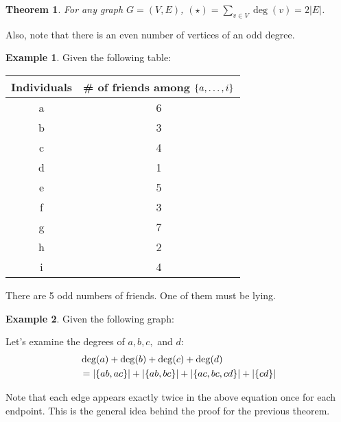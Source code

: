 \documentclass[]{article}
\newtheorem*{theorem}{Theorem}
\theoremstyle{definition}
\newtheorem{ex}{Example}[section]
\newcommand{\lecture}[1]{\marginpar{{\footnotesize $\leftarrow$ \underline{#1}}}}
\DeclarePairedDelimiter{\set}{\lbrace}{\rbrace}
\begin{document}
			\begin{theorem}
				For any graph $G = (V, E)$, $(\star) = \displaystyle \sum_{v \in V} \deg(v) = 2|E|$.
			\end{theorem}

			Also, note that there is an even number of vertices of an odd degree.
			
			\begin{ex} Given the following table:
				\begin{center}
					\begin{tabular}{c|c}
						Individuals & \# of friends among $\set{a, \ldots, i}$ \\ \hline
						a & 6 \\
						b & 3 \\
						c & 4 \\
						d & 1 \\
						e & 5 \\
						f & 3 \\
						g & 7 \\
						h & 2 \\
						i & 4
					\end{tabular}
				\end{center}
				
				There are 5 odd numbers of friends. One of them must be lying.
			\end{ex}
			
			\lecture{February 25, 2013}
			\begin{ex}
				Given the following graph:
				\begin{center}
				\end{center}

				Let's examine the degrees of $a, b, c,$ and $d$:
				\begin{align*}
					&\deg(a) + \deg(b) + \deg(c) + \deg(d) \\
					&= |\set{ab, ac}| + |\set{ab, bc}| + |\set{ac, bc, cd}| + |\set{cd}|
				\end{align*}

				Note that each edge appears exactly twice in the above equation \textendash{} once for each endpoint. This is the general idea behind the proof for the previous theorem.
			\end{ex}
\end{document}
